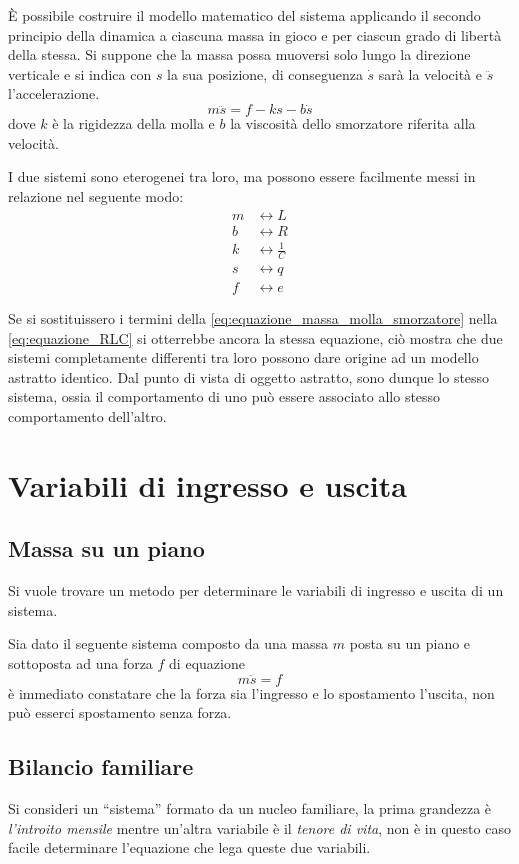È possibile costruire il modello matematico del sistema applicando il secondo principio della
dinamica a ciascuna massa in gioco e per ciascun grado di libertà della stessa.
Si suppone che la massa possa muoversi solo lungo la direzione verticale e si indica con $s$ la sua
posizione, di conseguenza $\dot{s}$ sarà la velocità e $\ddot{s}$ l'accelerazione.
\begin{equation}
 m\ddot{s} = f - ks - b\dot{s}
 \label{eq:equazione_massa_molla_smorzatore}
\end{equation}
dove $k$ è la rigidezza della molla e $b$ la viscosità dello smorzatore riferita alla velocità.

I due sistemi sono eterogenei tra loro, ma possono essere facilmente messi in relazione nel
seguente modo:
$$
\begin{aligned}
m &\leftrightarrow L\\
b &\leftrightarrow R\\
k &\leftrightarrow \frac{1}{C}\\
s &\leftrightarrow q\\
f &\leftrightarrow e
\end{aligned}
$$

Se si sostituissero i termini della
\ref{eq:equazione_massa_molla_smorzatore}
 nella \ref{eq:equazione_RLC} si otterrebbe ancora la stessa equazione, ciò mostra che due sistemi
completamente differenti tra loro possono dare origine ad un modello astratto identico.
Dal punto di vista di oggetto astratto, sono dunque lo stesso sistema, ossia il comportamento di
uno può essere associato allo stesso comportamento dell'altro.

\newpage
\section{Variabili di ingresso e uscita}
\subsection{Massa su un piano}
Si vuole trovare un metodo per determinare le variabili di ingresso e uscita di un sistema.

Sia dato il seguente sistema composto da una massa $m$ posta su un piano e sottoposta ad una forza
$f$ di equazione
\begin{equation}
 m\ddot{s} = f
\end{equation}
è immediato constatare che la forza sia l'ingresso e lo spostamento l'uscita, non può esserci
spostamento senza forza.
\subsection{Bilancio familiare}
Si consideri un ``sistema'' formato da un nucleo familiare, la prima grandezza è \textit{l'introito
mensile} mentre un'altra variabile è il \textit{tenore di vita}, non è in questo caso facile
determinare l'equazione che lega queste due variabili.

